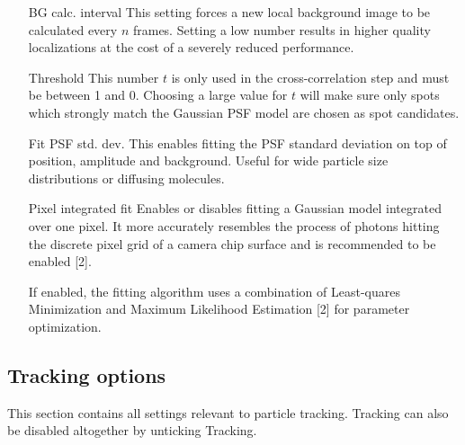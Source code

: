 \documentclass[11pt,onside]{report}
\makeatletter
\numberwithin{equation}{chapter}
\gdef\tshortstack{\@ifnextchar[\@tshortstack{\@tshortstack[c]}}
\gdef\@tshortstack[#1]{%
  \leavevmode
  \vtop\bgroup
    \baselineskip-\p@\lineskip 3\p@
    \let\mb@l\hss\let\mb@r\hss
    \expandafter\let\csname mb@#1\endcsname\relax
    \let\\\@stackcr
    \@ishortstack}
\makeatother
\begin{document}
\begin{itemize}[leftmargin=2cm]
\item[BG calc. interval] This setting forces a new local background image to be calculated every $n$ frames. Setting a low number results in higher quality localizations at the cost of a severely reduced performance.
\item[Threshold] This number $t$ is only used in the cross-correlation step and must be between 1 and 0. Choosing a large value for $t$ will make sure only spots which strongly match the Gaussian PSF model are chosen as spot candidates.\\[0pt]%
%
\item[Fit PSF std. dev.] This enables fitting the PSF standard deviation on top of position, amplitude and background. Useful for wide particle size distributions or diffusing molecules.
\item[Pixel integrated fit] Enables or disables fitting a Gaussian model integrated over one pixel. It more accurately resembles the process of photons hitting the discrete pixel grid of a camera chip surface and is recommended to be enabled [2].
\item[\smash{\tshortstack[1]{Maximum Likeli- \\hood refinement}}] If enabled, the fitting algorithm uses a combination of Least-quares Minimization and Maximum Likelihood Estimation [2] for parameter optimization.
\end{itemize}

\subsection*{Tracking options}
This section contains all settings relevant to particle tracking. Tracking can also be disabled altogether by unticking \textsf{Tracking}.
\end{document}

